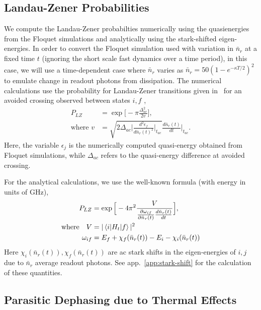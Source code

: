 \documentclass[%
reprint,
superscriptaddress,
 amsmath,amssymb,
 aps,
 prx,
longbibliography,
floatfix,
]{revtex4-2}
\begin{document}
\subsection{Landau-Zener Probabilities}\label{app:LZ}
We compute the Landau-Zener probabilties numerically using the quasienergies from the Floquet simulations and analytically using the stark-shifted eigen-energies. In order to convert the Floquet simulation used with variation in $\bar n_r$ at a fixed time $t$ (ignoring the short scale fast dynamics over a time period), in this case, we will use a time-dependent case where $\bar n_r$ varies as $\bar n_r=50(1-e^{-\kappa T/2})^2$ to emulate change in readout photons from dissipation. The numerical calculations use the probability for Landau-Zener transitions given in~\cite{ikeda2022floquet} for an avoided crossing observed between states $i,f$ ,
\begin{align}
    P_{LZ}&=\exp{\Big[-\pi \frac{\Delta_{ac}^2}{2v}\Big]},\\
    \text{where } v&=\sqrt{2\Delta_{ac}\Big|\frac{d^2\epsilon_f}{d\bar{n}_r(t)^2}\Big|_{t_{ac}}}\frac{d\bar{n}_r(t)}{dt}|_{t_{ac}}\Big.
\end{align}
Here, the variable $\epsilon_j$ is the numerically computed quasi-energy obtained from Floquet simulations, while $\Delta_{ac}$ refers to the quasi-energy difference at avoided crossing.

For the analytical calculations, we use the well-known formula (with energy in units of GHz), 
\begin{align}
    P_{LZ}&=\exp{\Big[-4\pi^2 \frac{V}{\frac{\partial\omega_{if}}{\partial\bar n_r(t)}\frac{d\bar n_r(t)}{dt}}\Big]},\\
    \text{where}\quad V&=|\braket{i|H_{t}|f}|^2\\
    \omega_{if}&=E_f+\chi_f(\bar n_r(t))-E_i-\chi_i(\bar n_r(t))
\end{align}
Here $\chi_i(\bar n_r(t)), \chi_f(\bar n_r(t))$ are ac stark shifts in the eigen-energies of $i,j$ due to $\bar n_r$ average readout photons. See app.~\ref{app:stark-shift} for the calculation of these quantities.
\subsection{Parasitic Dephasing due to Thermal Effects}\label{app:dephasing}
\end{document}
